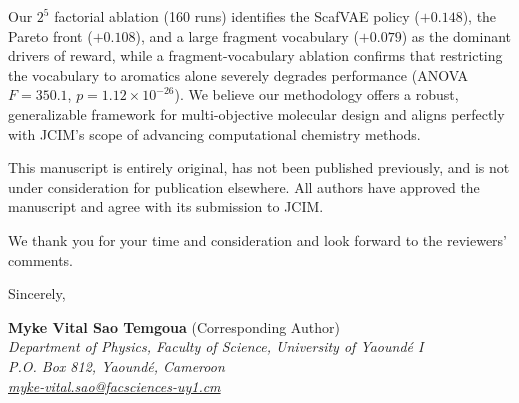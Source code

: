 \documentclass[11pt,a4paper]{article}
\begin{document}
\vspace{1em}

\noindent
Our $2^{5}$ factorial ablation (160 runs) identifies the ScafVAE policy ($+0.148$), the Pareto front ($+0.108$), and a large fragment vocabulary ($+0.079$) as the dominant drivers of reward, while a fragment-vocabulary ablation confirms that restricting the vocabulary to aromatics alone severely degrades performance (ANOVA $F = 350.1$, $p = 1.12 \times 10^{-26}$). We believe our methodology offers a robust, generalizable framework for multi-objective molecular design and aligns perfectly with JCIM’s scope of advancing computational chemistry methods.

\vspace{1em}

\noindent
This manuscript is entirely original, has not been published previously, and is not under consideration for publication elsewhere. All authors have approved the manuscript and agree with its submission to JCIM.

\vspace{1em}

\noindent
We thank you for your time and consideration and look forward to the reviewers' comments.

\vspace{2em}

\noindent
Sincerely,

\vspace{3em}

\noindent
\textbf{Myke Vital Sao Temgoua} (Corresponding Author)\\
\textit{Department of Physics, Faculty of Science, University of Yaound\'{e} I}\\
\textit{P.O. Box 812, Yaound\'{e}, Cameroon}\\
\href{mailto:myke-vital.sao@facsciences-uy1.cm}{\textit{myke-vital.sao@facsciences-uy1.cm}}
\end{document}

